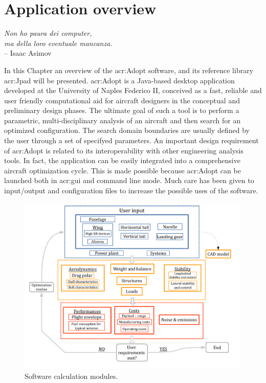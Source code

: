 \chapter{Application overview}
\label{ch:applicationoverview}

\begin{flushright}
	{\smaller
		\textit{Non ho paura dei computer, 
\\ ma della loro eventuale mancanza.}\\
		--  Isaac Asimov}
\end{flushright}
In this Chapter an overview of the \gls{acr:Adopt} software, and its reference library \gls{acr:Jpad} will be presented.
\gls{acr:Adopt} is a Java-based desktop application developed at the University of Naples Federico II, conceived as a fast, reliable and user friendly computational aid for aircraft designers in the conceptual and preliminary design phases. The ultimate goal of such a tool is to perform a parametric, multi-disciplinary analysis of an aircraft and then search for an optimized configuration. The search domain boundaries are usually defined by the user through a set of specifyed parameters. An important design requirement of  \gls{acr:Adopt} is related to its interoperability with other engineering analysis tools. In fact, the application can be easily integrated into a comprehensive aircraft optimization cycle. This is made possible because  \gls{acr:Adopt} can be launched both in \gls{acr:gui} and command line mode. Much care has been given to input/output and configuration files to increase the possible uses of the software.

\begin{figure}[H]
	\centering
	\includegraphics[height = 8.6cm ]{Immagini/flowchart3}
	\caption{Software calculation modules.}
	\label{fig:guiStart}
\end{figure}

